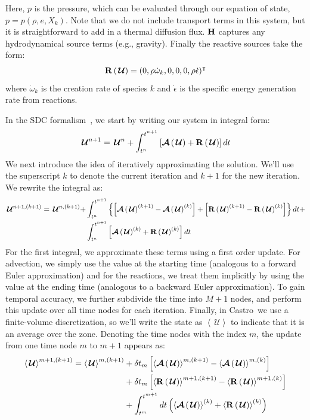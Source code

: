 \documentclass[a4paper]{jpconf}
\newcommand{\castro}{{\sffamily Castro}}
\newcommand{\Uc}{{\,\bm{\mathcal{U}}}}
\newcommand{\Advs}[1]{\boldsymbol{\mathcal{A}} \left(#1\right)}
\newcommand{\omegadot}{\dot{\omega}}
\newcommand{\avg}[1]{{\left \langle #1 \right \rangle}}
\newcommand{\Rbs}[1]{{\bf R} \left ( #1 \right )}
\begin{document}
Here, $p$ is the pressure, which can be evaluated through our equation
of state, $p = p(\rho, e, X_k)$.  Note that we do not include
transport terms in this system, but it is straightforward to add in a
thermal diffusion flux.  ${\bf H}$ captures any hydrodynamical source
terms (e.g., gravity).  Finally the reactive sources take the form:
\begin{equation}
\Rbs{\Uc} = (0, \rho \omegadot_k, 0, 0, 0, \rho \dot{\epsilon})^\intercal
\end{equation}
where $\omegadot_k$ is the creation rate of species $k$ and $\dot{\epsilon}$
is the specific energy generation rate from reactions.

In the SDC formalism~\cite{dutt:2000,minion:2003}, we start by writing our system in integral form:
\begin{equation}
\Uc^{n+1} = \Uc^n + \int_{t^n}^{t^{n+1}} \left [\Advs{\Uc} + \Rbs{\Uc} \right ] dt
\end{equation}
We next introduce the idea of iteratively approximating the solution.
We'll use the superscript $k$ to denote the current iteration and
$k+1$ for the new iteration.  We rewrite the integral as:
\begin{align}
\Uc^{n+1,(k+1)} = \Uc^{n,(k+1)} +
   &\int_{t^n}^{t^{n+1}} \left \{ \left [ \Advs{\Uc}^{(k+1)} - \Advs{\Uc}^{(k)} \right ]
   + \left [ \Rbs{\Uc}^{(k+1)} - \Rbs{\Uc}^{(k)} \right ] \right \} dt + \nonumber \\
  & \int_{t^n}^{t^{n+1}} \left [\Advs{\Uc}^{(k)} + \Rbs{\Uc}^{(k)} \right ] dt
\end{align}
For the first integral, we approximate these terms using a first order
update.  For advection, we simply use the value at the starting time
(analogous to a forward Euler approximation) and for the reactions, we
treat them implicitly by using the value at the ending time (analogous
to a backward Euler approximation).  To gain temporal accuracy, we
further subdivide the time into $M+1$ nodes, and perform this update
over all time nodes for each iteration.  Finally, in \castro\ we use a finite-volume
discretization, so we'll write the state as $\avg{\Uc}$ to indicate that it is an average over the zone.
Denoting the time nodes with
the index $m$, the update from one time node $m$ to $m+1$ appears as:
    \begin{align}
      \label{eq:sdc:general}
      \avg{\Uc}^{{m+1},(k+1)} = \avg{\Uc}^{m,(k+1)}
            &+ \delta t_m \left [ \avg{\Advs{\Uc}}^{m,(k+1)} - \avg{\Advs{\Uc}}^{m,(k)} \right ] \nonumber \\
            &+ \delta t_m \left [ \avg{\Rbs{\Uc}}^{{m+1},(k+1)} - \avg{\Rbs{\Uc}}^{{m+1},(k)} \right ] \nonumber \\
            &+ \int_{t^m}^{t^{m+1}} dt  \left (\avg{\Advs{\Uc}}^{(k)} + \avg{\Rbs{\Uc}}^{(k)}\right)
   \end{align}
\end{document}
